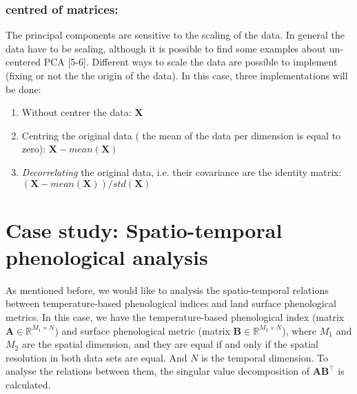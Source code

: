 \documentclass{article}
\def\X{{\mathbf X}}
\def\A{{\mathbf A}}
\def\B{{\mathbf B}}
\def\U{{\mathbf U}}
\def\V{{\mathbf V}}
\def\v{{\mathbf v}}
\def\u{{\mathbf u}}
\def\R{\mathbb{R}}
\begin{document}
\subsubsection{centred of matrices:}
The principal components are sensitive to the scaling of the data. In general the data have to be scaling, although it is possible to find some examples about un-centered PCA [5-6]. Different ways to scale the data are possible to implement (fixing or not the the origin of the data). In this case, three implementations will be done:
\begin{enumerate}
\item Without centrer the data: $\X$
\item Centring the original data ( the mean of the data per dimension is equal to zero): $\X-mean(\X)$
\item {\em Decorrelating} the original data, i.e. their covariance are the identity matrix: ${(\X-mean(\X))}/{std(\X)}$
\end{enumerate}




\section{Case study: Spatio-temporal phenological analysis}
As mentioned before, we would like to analysis the spatio-temporal relations between temperature-based phenological indices and land surface phenological metrics. In this case, we have the temperature-based phenological index (matrix $\A \in \R^{M_1 \times N}$) and surface phenological metric (matrix $\B \in \R^{M_2 \times N}$), where $M_1$ and $M_2$ are the spatial dimension, and they are equal if and only if the spatial resolution in both data sets are equal. And $N$ is the temporal dimension. To analyse the relations between them, the singular value decomposition of $\A\B^{\top}$ is calculated.\\
\end{document}
